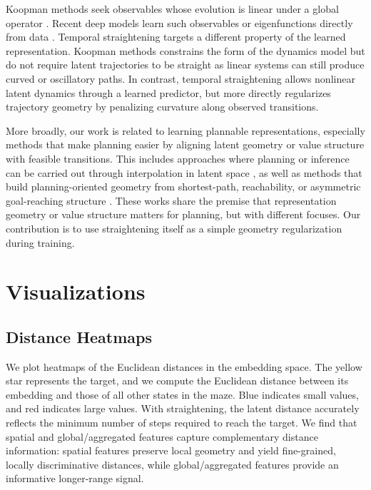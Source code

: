 Koopman methods seek observables whose evolution is linear under a global operator \citep{koopman1931hamiltonian}. Recent deep models learn such observables or eigenfunctions directly from data \citep{lusch2018koopman,yeung2019koopman,takeishi2017learning,cheng2026information}. Temporal straightening targets a different property of the learned representation. Koopman methods constrains the form of the dynamics model but do not require latent trajectories to be straight as linear systems can still produce curved or oscillatory paths. In contrast, temporal straightening allows nonlinear latent dynamics through a learned predictor, but more directly regularizes trajectory geometry by penalizing curvature along observed transitions.

More broadly, our work is related to learning plannable representations, especially methods that make planning easier by aligning latent geometry or value structure with feasible transitions. This includes approaches where planning or inference can be carried out through interpolation in latent space \citep{eysenbach2024inference,kurutach2018causalinfogan,wang2019visualplanning}, as well as methods that build planning-oriented geometry from shortest-path, reachability, or asymmetric goal-reaching structure \citep{yang2020plan2vec,wang2023quasimetric}. These works share the premise that representation geometry or value structure matters for planning, but with different focuses. Our contribution is to use straightening itself as a simple geometry regularization during training.




\clearpage
\section{Visualizations}

\subsection{Distance Heatmaps}
\label{app:heatmap}

We plot heatmaps of the Euclidean distances in the embedding space. The yellow star represents the target, and we compute the Euclidean distance between its embedding and those of all other states in the maze. Blue indicates small values, and red indicates large values. With straightening, the latent distance accurately reflects the minimum number of steps required to reach the target. We find that spatial and global/aggregated features capture complementary distance information: spatial features preserve local geometry and yield fine-grained, locally discriminative distances, while global/aggregated features provide an informative longer-range signal.

